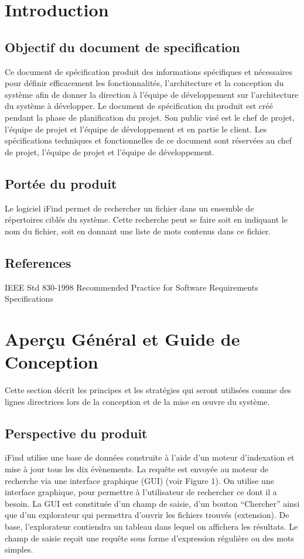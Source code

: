 \section{Introduction}

\subsection{Objectif du document de specification} 
Ce document de spécification produit des informations spécifiques et nécessaires
pour définir efficacement les fonctionnalités, l'architecture et la conception
du système afin de donner la direction à l'équipe de développement sur
l'architecture du système à développer. Le document de spécification du produit
est créé pendant la phase de planification du projet. Son public visé est le
chef de projet, l'équipe de projet et l'équipe de développement et en partie le
client. Les spécifications techniques et fonctionnelles de ce document sont
réservées au chef de projet, l'équipe de projet et l'équipe de développement.


\subsection{Portée du produit}
Le logiciel iFind permet de rechercher un fichier dans un ensemble de\\
répertoires ciblés du système. Cette recherche peut se faire soit en indiquant
le nom du fichier, soit en donnant une liste de mots contenus dans ce fichier.




\subsection{References}
IEEE Std 830-1998 Recommended Practice for Software Requirements Specifications 

\newpage

\section{Aperçu Général et Guide de Conception}
Cette section décrit les principes et les stratégies qui seront utilisées comme
des lignes directrices lors de la conception et de la mise en œuvre du système.

\subsection{Perspective du produit}
iFind utilise une base de données construite à l'aide d'un moteur d'indexation
et mise à jour tous les dix évènements. La requête est envoyée au moteur
de recherche via une interface graphique (GUI) (voir Figure 1). On utilise une
interface graphique, pour permettre à l’utilisateur de rechercher ce dont il a
besoin. La GUI est constituée d’un champ de saisie, d’un bouton “Chercher” ainsi
que d’un explorateur qui permettra d’ouvrir les fichiers trouvés (extension). De
base, l’explorateur contiendra un tableau dans lequel on affichera les
résultats. Le champ de saisie reçoit une requête sous forme d’expression
régulière ou des mots simples.

